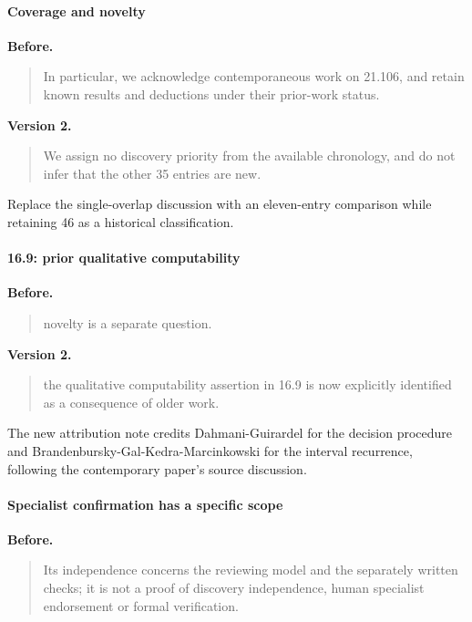 \paragraph{Coverage and novelty}

\noindent\textbf{Before.}
\begin{quote}\small
In particular, we acknowledge
contemporaneous work on 21.106, and retain known results and deductions
under their prior-work status.
\end{quote}

\noindent\textbf{Version 2.}
\begin{quote}\small
We assign no discovery priority from the available chronology, and do not
infer that the other 35 entries are new.
\end{quote}

Replace the single-overlap discussion with an eleven-entry comparison while retaining 46 as a historical classification.

\paragraph{16.9: prior qualitative computability}

\noindent\textbf{Before.}
\begin{quote}\small
novelty is a separate question.
\end{quote}

\noindent\textbf{Version 2.}
\begin{quote}\small
the qualitative computability assertion
in 16.9 is now explicitly identified as a consequence of older work.
\end{quote}

The new attribution note credits Dahmani-Guirardel for the decision procedure and Brandenbursky-Gal-Kedra-Marcinkowski for the interval recurrence, following the contemporary paper's source discussion.

\paragraph{Specialist confirmation has a specific scope}

\noindent\textbf{Before.}
\begin{quote}\small
Its independence concerns the reviewing model and the separately written
checks; it is not a proof of discovery independence, human specialist
endorsement or formal verification.
\end{quote}


